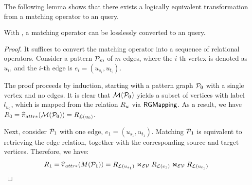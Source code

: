 The following lemma shows that there exists a logically equivalent transformation from a matching operator to an \spj query.

\begin{lemma}
    \label{lem:spjm-to-spj}
    With \rgmapping, a matching operator can be losslessly converted to an \spj query.
\end{lemma}
\begin{proof}
    It suffices to convert the matching operator into a sequence of relational operators. Consider a pattern $\mathcal{P}_m$ of $m$ edges, where the $i$-th vertex is denoted as $u_i$, and the $i$-th edge is $e_i = (u_{s_i}, u_{t_i})$. %

The proof proceeds by induction, starting with a pattern graph $\mathcal{P}_0$ with a single vertex and no edges. It is clear that $\mathcal{M}(\mathcal{P}_0)$ yields a subset of vertices with label $l_{u_0}$, which is mapped from the relation ${R_{u}}$ via ${\mathsf{RGMapping}}$. As a result, we have $R_0 = \widehat{\pi}_{attr*}(\mathcal{M}(\mathcal{P}_0)) = {R_{\mathcal{L}(u_0)}}$.

Next, consider $\mathcal{P}_1$ with one edge, $e_1 = (u_{s_1}, u_{t_1})$. Matching $\mathcal{P}_1$ is equivalent to retrieving the edge relation, together with the corresponding source and target vertices. Therefore, we have:
\[ R_1 = \widehat{\pi}_{attr*}(M(\mathcal{P}_1)) = {R_{\mathcal{L}(u_{s_1})}} \Join_\mathcal{EV} {R_{\mathcal{L}(e_1)}} \Join_\mathcal{EV} {R_{\mathcal{L}(u_{t_1})}} \]


\end{proof}
